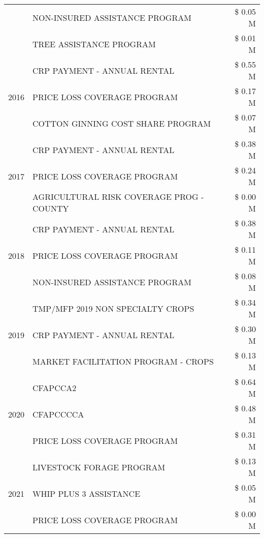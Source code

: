 \begin{tabular}{llr}
 & NON-INSURED ASSISTANCE PROGRAM & \$ 0.05 M \\
 & TREE ASSISTANCE PROGRAM & \$ 0.01 M \\
\cline{1-3}
\multirow[t]{3}{*}{2016} & CRP PAYMENT - ANNUAL RENTAL & \$ 0.55 M \\
 & PRICE LOSS COVERAGE PROGRAM & \$ 0.17 M \\
 & COTTON GINNING COST SHARE PROGRAM & \$ 0.07 M \\
\cline{1-3}
\multirow[t]{3}{*}{2017} & CRP PAYMENT - ANNUAL RENTAL & \$ 0.38 M \\
 & PRICE LOSS COVERAGE PROGRAM & \$ 0.24 M \\
 & AGRICULTURAL RISK COVERAGE PROG - COUNTY & \$ 0.00 M \\
\cline{1-3}
\multirow[t]{3}{*}{2018} & CRP PAYMENT - ANNUAL RENTAL & \$ 0.38 M \\
 & PRICE LOSS COVERAGE PROGRAM & \$ 0.11 M \\
 & NON-INSURED ASSISTANCE PROGRAM & \$ 0.08 M \\
\cline{1-3}
\multirow[t]{3}{*}{2019} & TMP/MFP 2019 NON SPECIALTY CROPS & \$ 0.34 M \\
 & CRP PAYMENT - ANNUAL RENTAL & \$ 0.30 M \\
 & MARKET FACILITATION PROGRAM - CROPS & \$ 0.13 M \\
\cline{1-3}
\multirow[t]{3}{*}{2020} & CFAPCCA2 & \$ 0.64 M \\
 & CFAPCCCCA & \$ 0.48 M \\
 & PRICE LOSS COVERAGE PROGRAM & \$ 0.31 M \\
\cline{1-3}
\multirow[t]{3}{*}{2021} & LIVESTOCK FORAGE PROGRAM & \$ 0.13 M \\
 & WHIP PLUS 3 ASSISTANCE & \$ 0.05 M \\
 & PRICE LOSS COVERAGE PROGRAM & \$ 0.00 M \\
\cline{1-3}
\bottomrule
\end{tabular}
